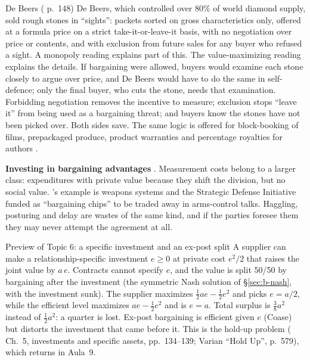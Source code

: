 \begin{example}{De Beers (\MR{} p.~148)}
De Beers, which controlled over 80\% of world diamond supply, sold rough stones in ``sights'':
packets sorted on gross characteristics only, offered at a formula price on a strict
take-it-or-leave-it basis, with no negotiation over price or contents, and with exclusion from
future sales for any buyer who refused a sight. A monopoly reading explains part of this. The
value-maximizing reading explains the details. If bargaining were allowed, buyers would examine
each stone closely to argue over price, and De Beers would have to do the same in self-defence;
only the final buyer, who cuts the stone, needs that examination. Forbidding negotiation removes
the incentive to measure; exclusion stops ``leave it'' from being used as a bargaining threat;
and buyers know the stones have not been picked over. Both sides save. The same logic is offered
for block-booking of films, prepackaged produce, product warranties and percentage royalties
for authors .
\end{example}

\textbf{Investing in bargaining advantages} . Measurement costs belong to a larger
class: expenditures with private value because they shift the division, but no social value.
\MR's example is weapons systems and the Strategic Defense Initiative funded as ``bargaining
chips'' to be traded away in arms-control talks. Haggling, posturing and delay are wastes of the
same kind, and if the parties foresee them they may never attempt the agreement at all.

\begin{example}{Preview of Topic 6: a specific investment and an ex-post split}
A supplier can make a relationship-specific investment $e \ge 0$ at private cost $e^2/2$ that
raises the joint value by $a\,e$. Contracts cannot specify $e$, and the value is split 50/50
by bargaining after the investment (the symmetric Nash solution of \S\ref{sec:b-nash}, with the
investment sunk). The supplier maximizes $\tfrac12 a e - \tfrac12 e^2$ and picks $e = a/2$, while
the efficient level maximizes $a e - \tfrac12 e^2$ and is $e = a$. Total surplus is
$\tfrac38 a^2$ instead of $\tfrac12 a^2$: a quarter is lost. Ex-post bargaining is efficient given
$e$ (Coase) but distorts the investment that came before it. This is the hold-up problem
(\MR{} Ch.~5, investments and specific assets, pp.~134--139; Varian ``Hold Up'', p.~579), which
returns in Aula~9.
\end{example}

